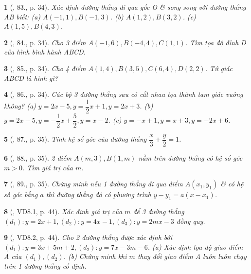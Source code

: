 \documentclass{article}
\newtheorem{baitoan}{}
\begin{document}
\begin{baitoan}[\cite{Binh_Toan_9_tap_1}, 83., p. 34]
	Xác định đường thẳng đi qua gốc O \& song song với đường thẳng AB biết: (a) $A(-1,1),B(-1,3)$. (b) $A(1,2),B(3,2)$. (c) $A(1,5),B(4,3)$.
\end{baitoan}

\begin{baitoan}[\cite{Binh_Toan_9_tap_1}, 84., p. 34]
	Cho 3 điểm $A(-1,6),B(-4,4),C(1,1)$. Tìm tọa độ đỉnh D của hình bình hành ABCD.
\end{baitoan}

\begin{baitoan}[\cite{Binh_Toan_9_tap_1}, 85., p. 34]
	Cho 4 điểm $A(1,4),B(3,5),C(6,4),D(2,2)$. Tứ giác ABCD là hình gì?
\end{baitoan}

\begin{baitoan}[\cite{Binh_Toan_9_tap_1}, 86., p. 34]
	Các bộ 3 đường thẳng sau có cắt nhau tọa thành tam giác vuông không? (a) $y = 2x - 5,y = \dfrac{1}{2}x + 1,y = 2x + 3$. (b) $y = 2x - 5,y = -\dfrac{1}{2}x + \dfrac{5}{2},y = x - 2$. (c) $y = -x + 1,y = x + 3,y = -2x + 6$.
\end{baitoan}

\begin{baitoan}[\cite{Binh_Toan_9_tap_1}, 87., p. 35]
	Tính hệ số góc của đường thẳng $\dfrac{x}{3} + \dfrac{y}{2} = 1$.
\end{baitoan}

\begin{baitoan}[\cite{Binh_Toan_9_tap_1}, 88., p. 35]
	2 điểm $A(m,3),B(1,m)$ nằm trên đường thẳng có hệ số góc $m > 0$. Tìm giá trị của $m$.
\end{baitoan}

\begin{baitoan}[\cite{Binh_Toan_9_tap_1}, 89., p. 35]
	Chứng minh nếu 1 đường thẳng đi qua điểm $A(x_1,y_1)$ \& có hệ số góc bằng $a$ thì đường thẳng đó có phương trình $y - y_1 = a(x - x_1)$.
\end{baitoan}

\begin{baitoan}[\cite{TLCT_THCS_Toan_9_dai_so}, VD8.1, p. 44]
	Xác định giá trị của $m$ để 3 đường thẳng $(d_1):y = 2x + 1,(d_2):y = 4x - 1,(d_3):y = 2mx - 3$ đồng quy.
\end{baitoan}

\begin{baitoan}[\cite{TLCT_THCS_Toan_9_dai_so}, VD8.2, p. 44]
	Cho 2 đường thẳng được xác định bởi $(d_1):y = 3x + 5m + 2,(d_2):y = 7x - 3m - 6$. (a) Xác định tọa độ giao điểm A của $(d_1),(d_2)$. (b) Chứng minh khi $m$ thay đổi giao điểm A luôn luôn chạy trên 1 đường thẳng cố định.
\end{baitoan}
\end{document}
